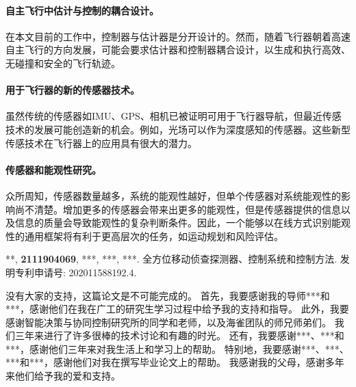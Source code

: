 \documentclass[
  type=master
]{gdutthesis}
\begin{document}
\paragraph{自主飞行中估计与控制的耦合设计。}
在本文目前的工作中，控制器与估计器是分开设计的。然而，随着飞行器朝着高速自主飞行的方向发展，可能会要求估计器和控制器耦合设计，以生成和执行高效、无碰撞和安全的飞行轨迹。
\paragraph{用于飞行器的新的传感器技术。}
虽然传统的传感器如IMU、GPS、相机已被证明可用于飞行器导航，但最近传感技术的发展可能创造新的机会。例如，光场可以作为深度感知的传感器。这些新型传感技术在飞行器上的应用具有很大的潜力。
\paragraph{传感器和能观性研究。}
众所周知，传感器数量越多，系统的能观性越好，但单个传感器对系统能观性的影响尚不清楚。增加更多的传感器会带来出更多的能观性，但是传感器提供的信息以及信息的质量会导致能观性的复杂判断条件。因此，一个能够以在线方式识别能观性的通用框架将有利于更高层次的任务，如运动规划和风险评估。

\nocite{*}%
\printbibliography



\begin{results}
  \item ***, \textbf{2111904069}, ***, ***, ***. 全方位移动侦查探测器、控制系统和控制方法. 发明专利申请号: 202011588192.4.
\end{results}

\gdutstatement


没有大家的支持，这篇论文是不可能完成的。
首先，我要感谢我的导师***和***，感谢他们在我在广工的研究生学习过程中给予我的支持和指导。
此外，我要感谢智能决策与协同控制研究所的同学和老师，以及海雀团队的师兄师弟们。
我们三年来进行了许多很棒的技术讨论和有趣的时光。
还有，我要感谢***、***和***，感谢他们三年来对我生活上和学习上的帮助。
特别地，我要感谢***、***、***和***，感谢他们对我在撰写毕业论文上的帮助。
我感谢我的父母，感谢多年来他们给予我的爱和支持。
%
\end{document}
